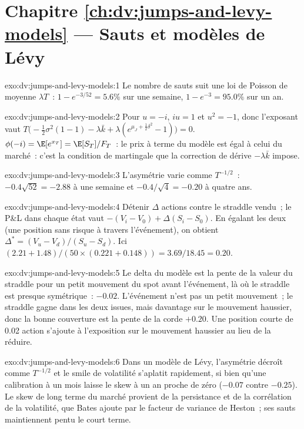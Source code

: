 \section*{Chapitre \ref{ch:dv:jumps-and-levy-models} --- Sauts et modèles de Lévy}

\begin{solution}{exo:dv:jumps-and-levy-models:1}
Le nombre de sauts suit une loi de Poisson de moyenne $\lambda T$~: $1-e^{-3/52}=5.6\%$ sur une semaine, $1-e^{-3}=95.0\%$ sur un an.
\end{solution}

\begin{solution}{exo:dv:jumps-and-levy-models:2}
Pour $u=-i$, $iu=1$ et $u^2=-1$, donc l'exposant vaut
$T\bigl(-\frac12\sigma^2(1-1)-\lambda\bar k+\lambda(e^{\mu_J+\frac12\delta^2}-1)\bigr)=0$. $\phi(-i)=\E[e^{x_T}]=\E[S_T]/F_T$~:
le prix à terme du modèle est égal à celui du marché~: c'est la condition de martingale
que la correction de dérive $-\lambda\bar k$ impose.
\end{solution}

\begin{solution}{exo:dv:jumps-and-levy-models:3}
L'asymétrie varie comme $T^{-1/2}$~: $-0.4\sqrt{52}=-2.88$ à une semaine et $-0.4/\sqrt4=-0.20$ à quatre ans.
\end{solution}

\begin{solution}{exo:dv:jumps-and-levy-models:4}
Détenir $\Delta$ actions contre le straddle vendu~; le P\&L dans chaque état vaut $-(V_i-V_0)+\Delta(S_i-S_0)$. En égalant
les deux (une position sans risque à travers l'événement), on obtient $\Delta^*=(V_u-V_d)/(S_u-S_d)$. Ici
$(2.21+1.48)/(50\times(0.221+0.148))=3.69/18.45=0.20$.
\end{solution}

\begin{solution}{exo:dv:jumps-and-levy-models:5}
Le delta du modèle est la pente de la valeur du straddle pour un petit mouvement du spot avant l'événement, là où le
straddle est presque symétrique~: $-0.02$. L'événement n'est pas un petit mouvement~; le straddle gagne dans les deux issues, mais
davantage sur le mouvement haussier, donc la bonne couverture est la pente de la corde $+0.20$. Une position courte de 0.02 action
s'ajoute à l'exposition sur le mouvement haussier au lieu de la réduire.
\end{solution}

\begin{solution}{exo:dv:jumps-and-levy-models:6}
Dans un modèle de Lévy, l'asymétrie décroît comme $T^{-1/2}$ et le smile de volatilité s'aplatit rapidement, si bien qu'une calibration à un mois laisse
le skew à un an proche de zéro ($-0.07$ contre $-0.25$). Le skew de long terme du marché provient de la persistance et
de la corrélation de la volatilité, que Bates ajoute par le facteur de variance de Heston~; ses sauts maintiennent pentu le court terme.
\end{solution}

